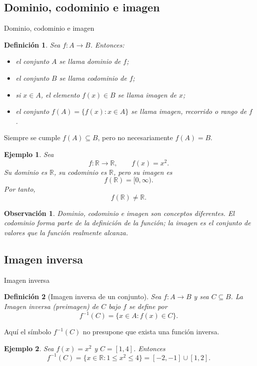 \documentclass[aspectratio=169,10pt]{beamer}
\newtheorem{definicion}{Definición}
\newtheorem{observacion}{Observación}
\newtheorem{ejemplo}{Ejemplo}
\newcommand{\R}{\mathbb{R}}
\begin{document}
\subsection{Dominio, codominio e imagen}
\begin{frame}{Dominio, codominio e imagen}

\begin{definicion}
Sea $f:A\to B$. Entonces:

\begin{itemize}
    \item el conjunto $A$ se llama \emph{dominio} de $f$;
    \item el conjunto $B$ se llama \emph{codominio} de $f$;
    \item si $x\in A$, el elemento $f(x)\in B$ se llama \emph{imagen} de $x$;
    \item el conjunto $f(A)=\{f(x):x\in A\}$ se llama \emph{imagen}, \emph{recorrido} o \emph{rango} de $f$.
\end{itemize}
\end{definicion}

Siempre se cumple $f(A)\subseteq B$, pero no necesariamente $f(A)=B$.

\begin{ejemplo}
Sea
\[
f:\R\to\R,\qquad f(x)=x^2.
\]
Su dominio es $\R$, su codominio es $\R$, pero su imagen es
\[
f(\R)=[0,\infty).
\]
Por tanto,
\[
f(\R)\neq\R.
\]
\end{ejemplo}

\begin{observacion}
Dominio, codominio e imagen son conceptos diferentes. El codominio forma parte de la definición de la función; la imagen es el conjunto de valores que la función realmente alcanza.
\end{observacion}

\end{frame}
\subsection{Imagen inversa}
\begin{frame}{Imagen inversa}

\begin{definicion}[Imagen inversa de un conjunto]
Sea $f:A\to B$ y sea $C\subseteq B$. La Imagen inversa (preimagen) de $C$ bajo $f$ se define por
\[
f^{-1}(C)=\{x\in A:f(x)\in C\}.
\]
\end{definicion}

Aquí el símbolo $f^{-1}(C)$ no presupone que exista una función inversa.

\begin{ejemplo}
Sea $f(x)=x^2$ y $C=[1,4]$. Entonces
\[
f^{-1}(C)=\{x\in\R:1\leq x^2\leq4\}
=[-2,-1]\cup[1,2].
\]
\end{ejemplo}

\end{frame}
\end{document}
